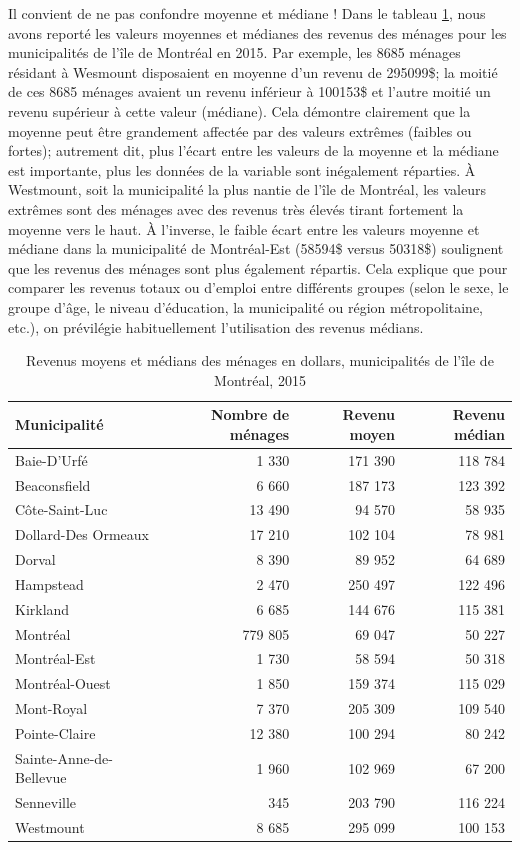 \documentclass[
  11pt,
  french,
]{book}
\begin{document}
Il convient de ne pas confondre moyenne et médiane ! Dans le tableau \ref{tab:tableRevMoyMed}, nous avons reporté les valeurs moyennes et médianes des revenus des ménages pour les municipalités de l'île de Montréal en 2015. Par exemple, les 8685 ménages résidant à Wesmount disposaient en moyenne d'un revenu de 295099\$; la moitié de ces 8685 ménages avaient un revenu inférieur à 100153\$ et l'autre moitié un revenu supérieur à cette valeur (médiane). Cela démontre clairement que la moyenne peut être grandement affectée par des valeurs extrêmes (faibles ou fortes); autrement dit, plus l'écart entre les valeurs de la moyenne et la médiane est importante, plus les données de la variable sont inégalement réparties. À Westmount, soit la municipalité la plus nantie de l'île de Montréal, les valeurs extrêmes sont des ménages avec des revenus très élevés tirant fortement la moyenne vers le haut. À l'inverse, le faible écart entre les valeurs moyenne et médiane dans la municipalité de Montréal-Est (58594\$ versus 50318\$) soulignent que les revenus des ménages sont plus également répartis. Cela explique que pour comparer les revenus totaux ou d'emploi entre différents groupes (selon le sexe, le groupe d'âge, le niveau d'éducation, la municipalité ou région métropolitaine, etc.), on prévilégie habituellement l'utilisation des revenus médians.

\begin{table}

\caption{\label{tab:tableRevMoyMed}Revenus moyens et médians des ménages en dollars, municipalités de l'île de Montréal, 2015}
\centering
\fontsize{8}{10}\selectfont
\begin{tabular}[t]{lrrr}
\toprule
Municipalité & Nombre de ménages & Revenu moyen & Revenu médian\\
\midrule
Baie-D'Urfé & 1 330 & 171 390 & 118 784\\
Beaconsfield & 6 660 & 187 173 & 123 392\\
Côte-Saint-Luc & 13 490 & 94 570 & 58 935\\
Dollard-Des Ormeaux & 17 210 & 102 104 & 78 981\\
Dorval & 8 390 & 89 952 & 64 689\\
\addlinespace
Hampstead & 2 470 & 250 497 & 122 496\\
Kirkland & 6 685 & 144 676 & 115 381\\
Montréal & 779 805 & 69 047 & 50 227\\
Montréal-Est & 1 730 & 58 594 & 50 318\\
Montréal-Ouest & 1 850 & 159 374 & 115 029\\
\addlinespace
Mont-Royal & 7 370 & 205 309 & 109 540\\
Pointe-Claire & 12 380 & 100 294 & 80 242\\
Sainte-Anne-de-Bellevue & 1 960 & 102 969 & 67 200\\
Senneville & 345 & 203 790 & 116 224\\
Westmount & 8 685 & 295 099 & 100 153\\
\bottomrule
\end{tabular}
\end{table}
\end{document}

